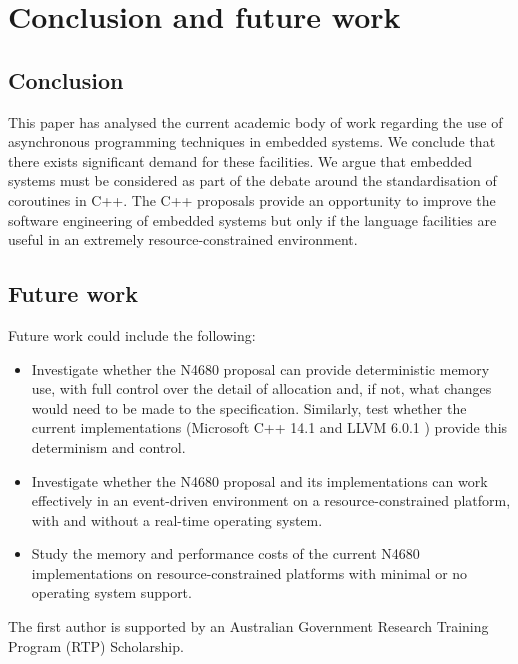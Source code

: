 \section{Conclusion and future work}
\label{section:conclusion}

\subsection{Conclusion}

This paper has analysed the current academic body of work regarding the use of asynchronous programming techniques in embedded systems. We conclude that there exists significant demand for these facilities. We argue that embedded systems must be considered as part of the debate around the standardisation of coroutines in C++. The C++ proposals provide an opportunity to improve the software engineering of embedded systems but only if the language facilities are useful in an extremely resource-constrained environment.

\subsection{Future work}

Future work could include the following:
\begin{itemize}
	\item Investigate whether the N4680 proposal can provide deterministic memory use, with full control over the detail of allocation and, if not, what changes would need to be made to the specification. Similarly, test whether the current implementations (Microsoft C++ 14.1 \cite{Microsoft2018} and LLVM 6.0.1 \cite{LLVMProject2018}) provide this determinism and control.
	\item Investigate whether the N4680 proposal and its implementations can work effectively in an event-driven environment on a resource-constrained platform, with and without a real-time operating system.
	\item Study the memory and performance costs of the current N4680 implementations on resource-constrained platforms with minimal or no operating system support.
\end{itemize}

\begin{acks}
The first author is supported by an Australian Government Research Training Program (RTP) Scholarship.
\end{acks}

